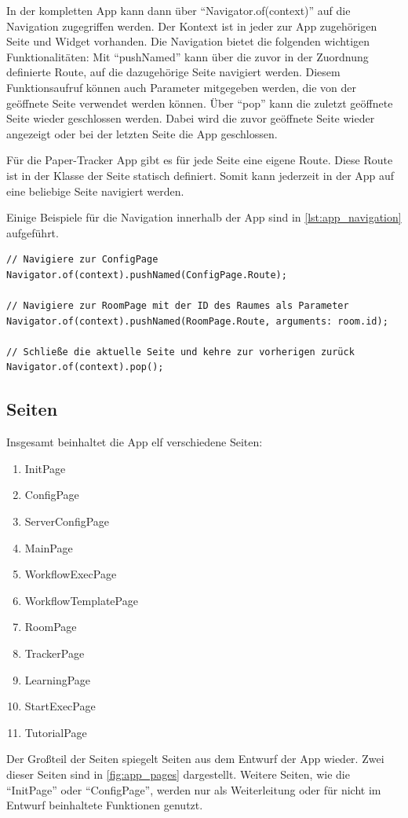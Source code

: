 In der kompletten App kann dann über \enquote{Navigator.of(context)} auf die Navigation zugegriffen werden.
Der Kontext ist in jeder zur App zugehörigen Seite und Widget vorhanden.
Die Navigation bietet die folgenden wichtigen Funktionalitäten:
Mit \enquote{pushNamed} kann über die zuvor in der Zuordnung definierte Route, auf die dazugehörige Seite navigiert werden.
Diesem Funktionsaufruf können auch Parameter mitgegeben werden, die von der geöffnete Seite verwendet werden können.
Über \enquote{pop} kann die zuletzt geöffnete Seite wieder geschlossen werden.
Dabei wird die zuvor geöffnete Seite wieder angezeigt oder bei der letzten Seite die App geschlossen.

Für die Paper-Tracker App gibt es für jede Seite eine eigene Route.
Diese Route ist in der Klasse der Seite statisch definiert.
Somit kann jederzeit in der App auf eine beliebige Seite navigiert werden.

Einige Beispiele für die Navigation innerhalb der App sind in \autoref{lst:app_navigation} aufgeführt.

\begin{lstlisting}[caption={Beispiele für die Navigation innerhalb der App},label={lst:app_navigation},tabsize=2]
// Navigiere zur ConfigPage
Navigator.of(context).pushNamed(ConfigPage.Route);

// Navigiere zur RoomPage mit der ID des Raumes als Parameter
Navigator.of(context).pushNamed(RoomPage.Route, arguments: room.id);

// Schließe die aktuelle Seite und kehre zur vorherigen zurück
Navigator.of(context).pop();
\end{lstlisting}

\subsection{Seiten}

Insgesamt beinhaltet die App elf verschiedene Seiten:
\begin{enumerate}
	\item InitPage
	\item ConfigPage
	\item ServerConfigPage
	\item MainPage
	\item WorkflowExecPage
	\item WorkflowTemplatePage
	\item RoomPage
	\item TrackerPage
	\item LearningPage
	\item StartExecPage
	\item TutorialPage
\end{enumerate}
Der Großteil der Seiten spiegelt Seiten aus dem Entwurf der App wieder.
Zwei dieser Seiten sind in \autoref{fig:app_pages} dargestellt.
Weitere Seiten, wie die \enquote{InitPage} oder \enquote{ConfigPage}, werden nur als Weiterleitung oder für nicht im
Entwurf beinhaltete Funktionen genutzt.

